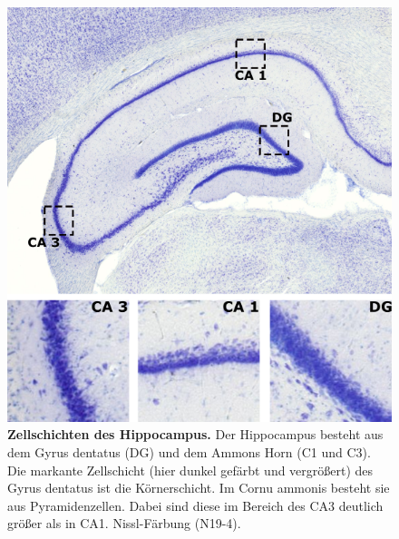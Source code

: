 \documentclass[12pt,a4paper,pdftex]{article}
\begin{document}
\begin{figure}[H]
    \centering
    \includegraphics{pictures/Basalganglia/schichten_hippocampus.png}
    \caption[Zellschichten des Hippocampus]{\textbf{Zellschichten des Hippocampus.} Der Hippocampus besteht aus dem Gyrus dentatus (DG) und dem Ammons Horn (C1 und C3). Die markante Zellschicht (hier dunkel gefärbt und vergrößert) des Gyrus dentatus ist die Körnerschicht. Im Cornu ammonis besteht sie aus Pyramidenzellen. Dabei sind diese im Bereich des CA3 deutlich größer als in CA1. Nissl-Färbung (N19-4).}
    \label{fig:Hippocampus_zellschicht}
\end{figure}
\end{document}

